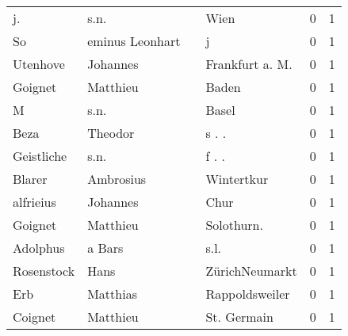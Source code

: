 \begin{center}
\begin{tiny}
\begin{longtabu}{llllrr}
                       j. &                               s.n. &             &                                        Wien &          0 &         1 \\
                       So &                    eminus Leonhart &             &                                           j &          0 &         1 \\
                 Utenhove &                           Johannes &             &                            Frankfurt a. M.  &          0 &         1 \\
                  Goignet &                           Matthieu &             &                                       Baden &          0 &         1 \\
                        M &                               s.n. &             &                                       Basel &          0 &         1 \\
                     Beza &                            Theodor &             &                                      s . .  &          0 &         1 \\
               Geistliche &                               s.n. &             &                                      f . .  &          0 &         1 \\
                   Blarer &                          Ambrosius &             &                                  Wintertkur &          0 &         1 \\
                alfrieius &                           Johannes &             &                                        Chur &          0 &         1 \\
                  Goignet &                           Matthieu &             &                                 Solothurn.  &          0 &         1 \\
                 Adolphus &                             a Bars &             &                                        s.l. &          0 &         1 \\
               Rosenstock &                               Hans &             &                              ZürichNeumarkt &          0 &         1 \\
                      Erb &                           Matthias &             &                              Rappoldsweiler &          0 &         1 \\
                  Coignet &                           Matthieu &             &                                 St. Germain &          0 &         1 \\

\end{longtabu}
\end{tiny}
\end{center}
